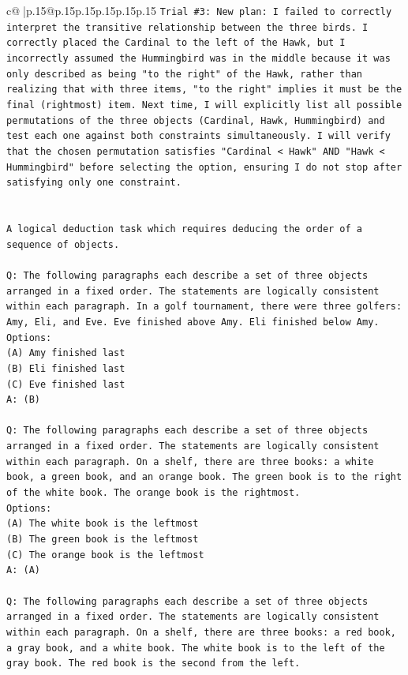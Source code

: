 \documentclass{article}
\begin{document}
{\begin{supertabular}{c@{$\;$}|p{.15\linewidth}@{}p{.15\linewidth}p{.15\linewidth}p{.15\linewidth}p{.15\linewidth}p{.15\linewidth}}
{{{\texttt{Trial \#3: New plan: I failed to correctly interpret the transitive relationship between the three birds. I correctly placed the Cardinal to the left of the Hawk, but I incorrectly assumed the Hummingbird was in the middle because it was only described as being "to the right" of the Hawk, rather than realizing that with three items, "to the right" implies it must be the final (rightmost) item. Next time, I will explicitly list all possible permutations of the three objects (Cardinal, Hawk, Hummingbird) and test each one against both constraints simultaneously. I will verify that the chosen permutation satisfies "Cardinal < Hawk" AND "Hawk < Hummingbird" before selecting the option, ensuring I do not stop after satisfying only one constraint.} \\
\\ 
\\ 
\texttt{A logical deduction task which requires deducing the order of a sequence of objects.} \\
\\ 
\texttt{Q: The following paragraphs each describe a set of three objects arranged in a fixed order. The statements are logically consistent within each paragraph. In a golf tournament, there were three golfers: Amy, Eli, and Eve. Eve finished above Amy. Eli finished below Amy.} \\
\texttt{Options:} \\
\texttt{(A) Amy finished last} \\
\texttt{(B) Eli finished last} \\
\texttt{(C) Eve finished last} \\
\texttt{A: (B)} \\
\\ 
\texttt{Q: The following paragraphs each describe a set of three objects arranged in a fixed order. The statements are logically consistent within each paragraph. On a shelf, there are three books: a white book, a green book, and an orange book. The green book is to the right of the white book. The orange book is the rightmost.} \\
\texttt{Options:} \\
\texttt{(A) The white book is the leftmost} \\
\texttt{(B) The green book is the leftmost} \\
\texttt{(C) The orange book is the leftmost} \\
\texttt{A: (A)} \\
\\ 
\texttt{Q: The following paragraphs each describe a set of three objects arranged in a fixed order. The statements are logically consistent within each paragraph. On a shelf, there are three books: a red book, a gray book, and a white book. The white book is to the left of the gray book. The red book is the second from the left.} \\
}}}
\end{supertabular}}
\end{document}
